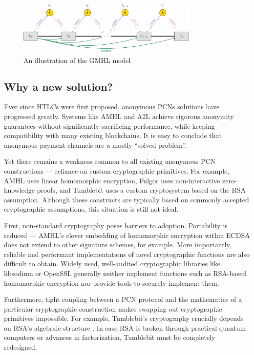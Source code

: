 \documentclass[USenglish,oneside,twocolumn]{article}
\begin{document}
\begin{figure}
    \centering
    \includegraphics[width=0.8\textwidth]{graphics/coinpassing.pdf}
    \caption{An illustration of the GMHL model}
    \label{fig:coinpassing}
\end{figure}

\subsection{Why a new solution?}

Ever since HTLCs were first proposed, anonymous PCNs solutions have progressed greatly. Systems like AMHL and A2L achieve rigorous anonymity guarantees without significantly sacrificing performance, while keeping compatibility with many existing blockchains. It is easy to conclude that anonymous payment channels are a mostly ``solved problem''.

Yet there remains a weakness common to all existing anonymous PCN constructions --- reliance on custom cryptographic primitives. For example, AMHL uses linear homomorphic encryption, Fulgor uses non-interactive zero-knowledge proofs, and Tumblebit uses a custom cryptosystem based on the RSA assumption. Although these constructs are typically based on commonly accepted cryptographic assumptions, this situation is still not ideal.

First, non-standard cryptography poses barriers to adoption. Portability is reduced --- AMHL's clever embedding of homomorphic encryption within ECDSA does not extend to other signature schemes, for example. More importantly, reliable and performant implementations of novel cryptographic functions are also difficult to obtain. Widely used, well-audited cryptographic libraries like libsodium \cite{libsodium} or OpenSSL \cite{openssl} generally neither implement functions such as RSA-based homomorphic encryption nor provide tools to securely implement them.

Furthermore, tight coupling between a PCN protocol and the mathematics of a particular cryptographic construction makes swapping out cryptographic primitives impossible. For example, Tumblebit's cryptography crucially depends on RSA's algebraic structure \cite{heilman2017tumblebit}. In case RSA is broken through practical quantum computers or advances in factorization, Tumblebit must be completely redesigned.
\end{document}
